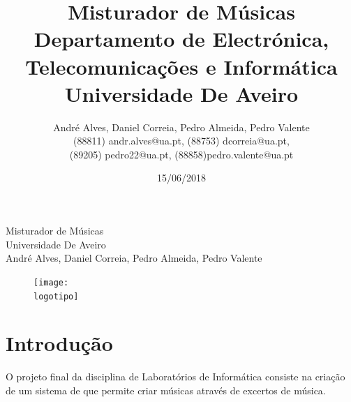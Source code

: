 \documentclass{report}
\begin{document}
%
\def\titulo{Misturador de Músicas}
\def\data{15/06/2018}
\def\autores{André Alves, Daniel Correia, Pedro Almeida, Pedro Valente}
\def\autorescontactos{(88811) andr.alves@ua.pt, (88753) dcorreia@ua.pt,\\
 (89205) pedro22@ua.pt, (88858)pedro.valente@ua.pt}
\def\departamento{Departamento de Electrónica, Telecomunicações e Informática}
\def\empresa{Universidade De Aveiro}
\def\logotipo{img/ua.pdf}
%

%
\begin{titlepage}

\begin{center}
%
\vspace*{50mm}
%
{\Huge \titulo}\\ 
%
\vspace{10mm}
%
{\Large \empresa}\\
%
\vspace{10mm}
%
{\LARGE \autores}\\ 
%
\vspace{30mm}
%
\begin{figure}[h]
\center
\texttt{[image: \\logotipo]}
\end{figure}
%
\vspace{30mm}
\end{center}
%

\end{titlepage}

\title{%
{\Huge\textbf{\titulo}}\\
{\Large \departamento\\ \empresa}
}
%
\author{%
    \autores \\
    \autorescontactos
}
%
\date{\data}
%
\maketitle



\tableofcontents
\listoffigures    %



\chapter{Introdução}
\label{chap.introducao}
O projeto final da disciplina de Laboratórios de Informática consiste na criação de um sistema de que permite criar músicas através de excertos de música.
\end{document}
